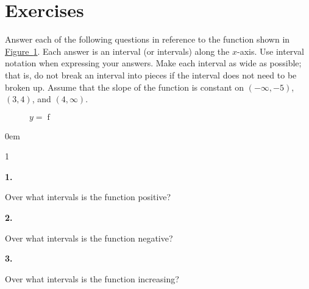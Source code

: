 \documentclass[12pt,]{book}
\theoremstyle{plain}
\theoremstyle{definition}
\numberwithin{equation}{section}
\newenvironment{exercisegroup}%
{\medskip\noindent}%
{\par\bigskip}%
\newlength{\exercisegroupindent}%
\newlength{\exercisegroupitemwidth}%
\newenvironment{exercisegrouplist}%
{\vspace{-\partopsep}%
\begin{adjustwidth}{\exercisegroupindent}{0em}}%
{\end{adjustwidth}%
\vspace{-\partopsep}%
\vspace{\baselineskip}}%
\newenvironment{exercisegroupbycol}[1]%
{\begin{exercisegrouplist}%
\vspace{-\multicolsep}%
\begin{multicols}{#1}%
\setlength{\parindent}{0em}%
\setlength{\exercisegroupitemwidth}{\linewidth}}%
{\end{multicols}%
\vspace{-\multicolsep}%
\end{exercisegrouplist}}%
\newenvironment{exercisegroupitem}[1]%
{\begin{minipage}[t]{\exercisegroupitemwidth}
\vspace{0pt}%
{\bfseries#1}%
\rule{0pt}{\baselineskip}}{\strut%
\end{minipage}%
\hspace{\columnsep}}%
\providecommand\phantomsection{}
\newcommand{\fe}[2]{\mathop{{#1}{\left(#2\right)}}}
\newcommand{\ointerval}[2]{\left(#1,#2\right)}
\begin{document}
\section*{Exercises}\label{exercises-21}

\begin{exercisegroup}%
Answer each of the following questions in reference to the function shown in \hyperref[figure-graph-features]{Figure~\ref*{figure-graph-features}}. Each answer is an interval (or intervals) along the \(x\)-axis. Use interval notation when expressing your answers. Make each interval as wide as possible; that is, do not break an interval into pieces if the interval does not need to be broken up. Assume that the slope of the function is constant on \(\ointerval{-\infty}{-5}\), \(\ointerval{3}{4}\), and \(\ointerval{4}{\infty}\).%
\begin{figure}
\centering
{
}
\caption{\(y=\fe{f}{x}\)\label{figure-graph-features}}
\end{figure}
\begin{exercisegroupbycol}{1}%
\begin{exercisegroupitem}{1. }\phantomsection\hypertarget{exercise-145}{\null}
Over what intervals is the function positive?%
\end{exercisegroupitem}%
\par%
\begin{exercisegroupitem}{2. }\phantomsection\hypertarget{exercise-146}{\null}
Over what intervals is the function negative?%
\end{exercisegroupitem}%
\par%
\begin{exercisegroupitem}{3. }\phantomsection\hypertarget{exercise-147}{\null}
Over what intervals is the function increasing?%
\end{exercisegroupitem}%

\end{exercisegroupbycol}
\end{exercisegroup}
\end{document}
